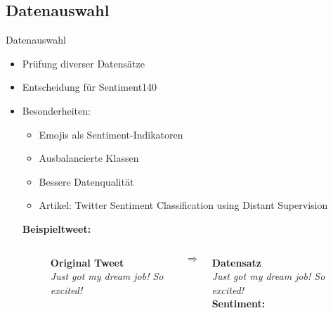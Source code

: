 \documentclass[aspectratio=169]{beamer} %
\begin{document}
\subsection{Datenauswahl}
\begin{frame}{Datenauswahl}
  \begin{itemize}
      \item Prüfung diverser Datensätze
      \item Entscheidung für \glqq Sentiment140\grqq
      \item Besonderheiten:
      \begin{itemize}
          \item Emojis als Sentiment-Indikatoren
          \item Ausbalancierte Klassen
          \item Bessere Datenqualität
          \item Artikel: \glqq Twitter Sentiment Classification using Distant Supervision\grqq
      \end{itemize}

      \vspace{0.5cm}
  \textbf{Beispieltweet:}
  \vspace{0.2cm}

\begin{figure}
    \centering
    \begin{columns}[T]
        \begin{column}{0.45\textwidth}
            \centering
            \textbf{Original Tweet}\\
            \textit{Just got my dream job! So excited! \yellowhighlight{:)}}
            \vspace{0.5cm}
        \end{column}
        
        \begin{column}{0.1\textwidth}
            \centering
            \LARGE $\Rightarrow$
        \end{column}
        
        \begin{column}{0.45\textwidth}
            \centering
            \textbf{Datensatz}\\
            \textit{Just got my dream job! So excited!} \\
            \vspace{0.2cm}
            \textbf{Sentiment: }
            \vspace{0.5cm}
        \end{column}
    \end{columns}
\end{figure}

  \end{itemize}
\end{frame}
\end{document}
